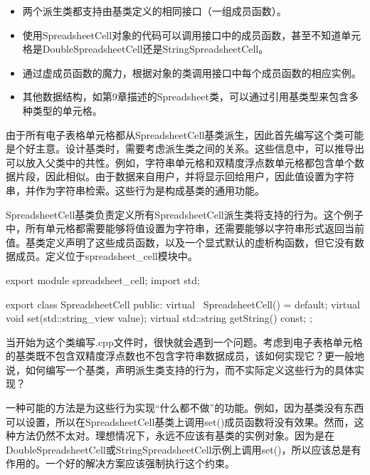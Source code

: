 \begin{itemize}
\item
两个派生类都支持由基类定义的相同接口（一组成员函数）。

\item
使用SpreadsheetCell对象的代码可以调用接口中的成员函数，甚至不知道单元格是DoubleSpreadsheetCell还是StringSpreadsheetCell。

\item
通过虚成员函数的魔力，根据对象的类调用接口中每个成员函数的相应实例。

\item
其他数据结构，如第9章描述的Spreadsheet类，可以通过引用基类型来包含多种类型的单元格。
\end{itemize}


由于所有电子表格单元格都从SpreadsheetCell基类派生，因此首先编写这个类可能是个好主意。设计基类时，需要考虑派生类之间的关系。这些信息中，可以推导出可以放入父类中的共性。例如，字符串单元格和双精度浮点数单元格都包含单个数据片段，因此相似。由于数据来自用户，并将显示回给用户，因此值设置为字符串，并作为字符串检索。这些行为是构成基类的通用功能。


SpreadsheetCell基类负责定义所有SpreadsheetCell派生类将支持的行为。这个例子中，所有单元格都需要能够将值设置为字符串，还需要能够以字符串形式返回当前值。基类定义声明了这些成员函数，以及一个显式默认的虚析构函数，但它没有数据成员。定义位于spreadsheet\_cell模块中。

\begin{cpp}
export module spreadsheet_cell;
import std;

export class SpreadsheetCell
{
    public:
        virtual ~SpreadsheetCell() = default;
        virtual void set(std::string_view value);
        virtual std::string getString() const;
};
\end{cpp}

当开始为这个类编写.cpp文件时，很快就会遇到一个问题。考虑到电子表格单元格的基类既不包含双精度浮点数也不包含字符串数据成员，该如何实现它？更一般地说，如何编写一个基类，声明派生类支持的行为，而不实际定义这些行为的具体实现？

一种可能的方法是为这些行为实现“什么都不做”的功能。例如，因为基类没有东西可以设置，所以在SpreadsheetCell基类上调用set()成员函数将没有效果。然而，这种方法仍然不太对。理想情况下，永远不应该有基类的实例对象。因为是在DoubleSpreadsheetCell或StringSpreadsheetCell示例上调用set()，所以应该总是有作用的。一个好的解决方案应该强制执行这个约束。

